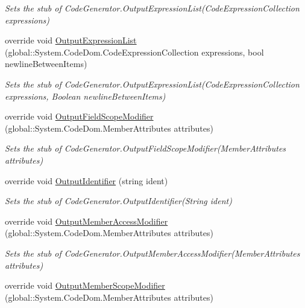 \begin{DoxyCompactItemize}
\begin{DoxyCompactList}\small\item\em Sets the stub of Code\-Generator.\-Output\-Expression\-List(\-Code\-Expression\-Collection expressions)\end{DoxyCompactList}\item 
override void \hyperlink{class_system_1_1_code_dom_1_1_compiler_1_1_fakes_1_1_stub_code_generator_a660d38f4edd09449fecc4baebb91ed1e}{Output\-Expression\-List} (global\-::\-System.\-Code\-Dom.\-Code\-Expression\-Collection expressions, bool newline\-Between\-Items)
\begin{DoxyCompactList}\small\item\em Sets the stub of Code\-Generator.\-Output\-Expression\-List(\-Code\-Expression\-Collection expressions, Boolean newline\-Between\-Items)\end{DoxyCompactList}\item 
override void \hyperlink{class_system_1_1_code_dom_1_1_compiler_1_1_fakes_1_1_stub_code_generator_a825ab0622b921935d3f905362bea64f9}{Output\-Field\-Scope\-Modifier} (global\-::\-System.\-Code\-Dom.\-Member\-Attributes attributes)
\begin{DoxyCompactList}\small\item\em Sets the stub of Code\-Generator.\-Output\-Field\-Scope\-Modifier(\-Member\-Attributes attributes)\end{DoxyCompactList}\item 
override void \hyperlink{class_system_1_1_code_dom_1_1_compiler_1_1_fakes_1_1_stub_code_generator_a8669f3242ffe81eaef97041bf164f764}{Output\-Identifier} (string ident)
\begin{DoxyCompactList}\small\item\em Sets the stub of Code\-Generator.\-Output\-Identifier(\-String ident)\end{DoxyCompactList}\item 
override void \hyperlink{class_system_1_1_code_dom_1_1_compiler_1_1_fakes_1_1_stub_code_generator_a1005164fc07f11b706b5e21f61270a37}{Output\-Member\-Access\-Modifier} (global\-::\-System.\-Code\-Dom.\-Member\-Attributes attributes)
\begin{DoxyCompactList}\small\item\em Sets the stub of Code\-Generator.\-Output\-Member\-Access\-Modifier(\-Member\-Attributes attributes)\end{DoxyCompactList}\item 
override void \hyperlink{class_system_1_1_code_dom_1_1_compiler_1_1_fakes_1_1_stub_code_generator_a71ee697edbffbb26a67217f4fc71941f}{Output\-Member\-Scope\-Modifier} (global\-::\-System.\-Code\-Dom.\-Member\-Attributes attributes)

\end{DoxyCompactItemize}
